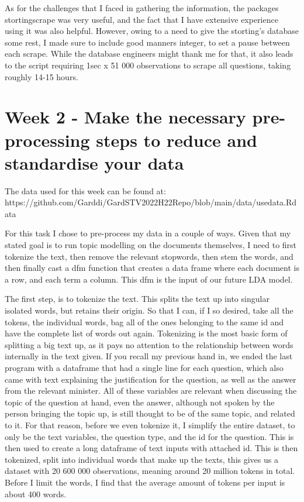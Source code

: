 \documentclass[12pt]{article}
\begin{document}
	As for the challenges that I faced in gathering the information, the packages stortingscrape was very useful, and the fact that I have extensive experience using it was also helpful. However, owing to a need to give the storting's database some rest, I made sure to include good manners integer, to set a pause between each scrape. While the database engineers might thank me for that, it also leads to the script requiring 1sec x 51 000 observations to scrape all questions, taking roughly 14-15 hours. 
	
	\section{ Week 2 - Make the necessary pre-processing steps to reduce and standardise your data}
	
	The data used for this week can be found at: \\ https://github.com/Garddi/GardSTV2022H22Repo/blob/main/data/usedata.Rdata 
	
	For this task I chose to pre-process my data in a couple of ways. Given that my stated goal is to run topic modelling on the documents themselves, I need to first tokenize the text, then remove the relevant stopwords, then stem the words, and then finally cast a dfm function that creates a data frame where each document is a row, and each term a column. This dfm is the input of our future LDA model. 
	
	The first step, is to tokenize the text. This splits the text up into singular isolated words, but retains their origin. So that I can, if I so desired, take all the tokens, the individual words, bag all of the ones belonging to the same id and have the complete list of words out again. Tokenizing is the most basic form of splitting a big text up, as it pays no attention to the relationship between words internally in the text given. If you recall my previous hand in, we ended the last program with a dataframe that had a single line for each question, which also came with text explaining the justification for the question, as well as the answer from the relevant minister. All of these variables are relevant when discussing the topic of the question at hand, even the answer, although not spoken by the person bringing the topic up, is still thought to be of the same topic, and related to it. For that reason, before we even tokenize it, I simplify the entire dataset, to only be the text variables, the question type, and the id for the question. This is then used to create a long dataframe of text inputs with attached id. This is then tokenized, split into individual words that make up the texts, this gives us a dataset with 20 600 000 observations, meaning around 20 million tokens in total. Before I limit the words, I find that the average amount of tokens per input is about 400 words. 
	
\end{document}
